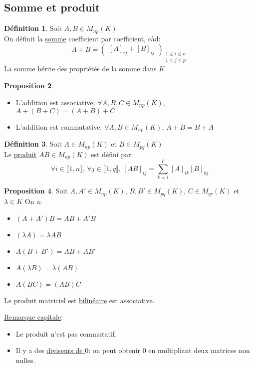 \documentclass[10pt,a4paper]{article}
\theoremstyle{definition}
\newtheorem{proposition}{Proposition}[section]
\newtheorem{definition}[proposition]{Définition}
\begin{document}
\subsection{Somme et produit}
\begin{definition}
Soit $A, B \in M_{np}(K)$ \\
On définit la \uline{somme} coefficient par coefficient, càd:
\[ A + B = \begin{pmatrix}
[A]_{ij} + [B]_{ij}
\end{pmatrix}_{\substack{1 \leq i \leq n \\ 1 \leq j \leq p}} \]
La somme hérite des propriétés de la somme dans $K$
\end{definition}
\begin{proposition}
\hfill
\begin{itemize}
\item L'addition est associative: $\forall A, B, C \in M_{np}(K)$, $A + (B + C) = (A + B) + C$
\item L'addition est commutative: $\forall A, B \in M_{np}(K)$, $A + B = B + A$
\end{itemize}
\end{proposition}
\begin{definition}
Soit $A \in M_{np}(K)$ et $B \in M_{pq}(K)$ \\
Le \uline{produit} $AB \in M_{np}(K)$ est défini par:
\[ \forall i \in \llbracket 1, n \rrbracket ,\, \forall j \in \llbracket 1, q \rrbracket ,\, [AB]_{ij} = \sum_{k = 1}^p [A]_{ik} [B]_{kj} \]
\end{definition}

\pagebreak

\begin{proposition}
Soit $A, A' \in M_{np}(K)$, $B, B' \in M_{pq}(K)$, $C \in M_{qr}(K)$ et $\lambda \in K$
On a:
\begin{itemize}
\item $(A + A') B = A B + A' B$
\item $(\lambda A) = \lambda A B$
\item $A (B + B') = A B + A B'$
\item $A ( \lambda B) = \lambda (AB)$
\item $A (BC) = (AB) C$
\end{itemize}
Le produit matriciel est \uline{bilinéaire} est associative.
\end{proposition}
\noindent \uline{Remarque capitale}:
\begin{itemize}
\item Le produit n'est pas commutatif.
\item Il y a des \uline{diviseurs de $0$}: on peut obtenir $0$ en multipliant deux matrices non nulles.
\end{itemize}
\end{document}
